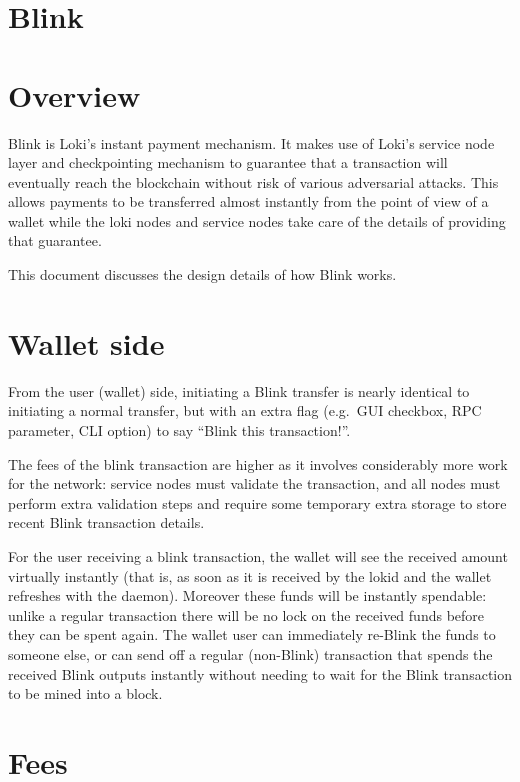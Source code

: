 \hypertarget{blink}{%
\section{Blink}\label{blink}}

\hypertarget{overview}{%
\section{Overview}\label{overview}}

Blink is Loki's instant payment mechanism. It makes use of Loki's
service node layer and checkpointing mechanism to guarantee that a
transaction will eventually reach the blockchain without risk of various
adversarial attacks. This allows payments to be transferred almost
instantly from the point of view of a wallet while the loki nodes and
service nodes take care of the details of providing that guarantee.

This document discusses the design details of how Blink works.

\hypertarget{wallet-side}{%
\section{Wallet side}\label{wallet-side}}

From the user (wallet) side, initiating a Blink transfer is nearly
identical to initiating a normal transfer, but with an extra flag
(e.g.~GUI checkbox, RPC parameter, CLI option) to say ``Blink this
transaction!''.

The fees of the blink transaction are higher as it involves considerably
more work for the network: service nodes must validate the transaction,
and all nodes must perform extra validation steps and require some
temporary extra storage to store recent Blink transaction details.

For the user receiving a blink transaction, the wallet will see the
received amount virtually instantly (that is, as soon as it is received
by the lokid and the wallet refreshes with the daemon). Moreover these
funds will be instantly spendable: unlike a regular transaction there
will be no lock on the received funds before they can be spent again.
The wallet user can immediately re-Blink the funds to someone else, or
can send off a regular (non-Blink) transaction that spends the received
Blink outputs instantly without needing to wait for the Blink
transaction to be mined into a block.

\hypertarget{fees}{%
\section{Fees}\label{fees}}

